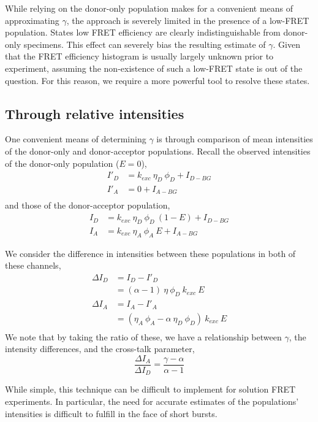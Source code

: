 \documentclass{article}
\begin{document}
While relying on the donor-only population makes for a convenient
means of approximating $\gamma$, the approach is severely limited in
the presence of a low-FRET population. States low FRET efficiency are
clearly indistinguishable from donor-only specimens. This effect can
severely bias the resulting estimate of $\gamma$. Given that the FRET
efficiency histogram is usually largely unknown prior to experiment,
assuming the non-existence of such a low-FRET state is out of the
question. For this reason, we require a more powerful tool to resolve
these states.

\subsection{Through relative intensities}

One convenient means of determining $\gamma$ is through comparison of 
mean intensities of the donor-only and donor-acceptor populations. 
Recall the observed intensities of the donor-only population ($E=0$),
\begin{align*}
I'_D & = k_{exc} ~ \eta_D ~ \phi_D  + I_{D-BG} \\
I'_A & = 0                         + I_{A-BG} \\
\end{align*}
and those of the donor-acceptor population,
\begin{align*}
I_D & = k_{exc} ~ \eta_D ~ \phi_D ~ (1 - E) + I_{D-BG} \\
I_A & = k_{exc} ~ \eta_A ~ \phi_A ~ E       + I_{A-BG} 
\end{align*}

We consider the difference in intensities between these populations
in both of these channels,
\begin{align*}
  \Delta I_D
  & = I_D - I'_D \\
  & = (\alpha - 1) ~ \eta ~ \phi_D ~ k_{exc} ~ E \\
  \Delta I_A
  & = I_A - I'_A \\
  & = (\eta_A ~ \phi_A - \alpha~\eta_D~\phi_D) ~ k_{exc} ~ E \\
\end{align*}
We note that by taking the ratio of these, we have a relationship between
$\gamma$, the intensity differences, and the cross-talk parameter,
\begin{equation}
  \frac{\Delta I_A}{\Delta I_D} = \frac{\gamma - \alpha}{\alpha - 1}
\end{equation}

While simple, this technique can be difficult to implement for
solution FRET experiments. In particular, the need for accurate
estimates of the populations' intensities is difficult to fulfill in
the face of short bursts.
\end{document}
